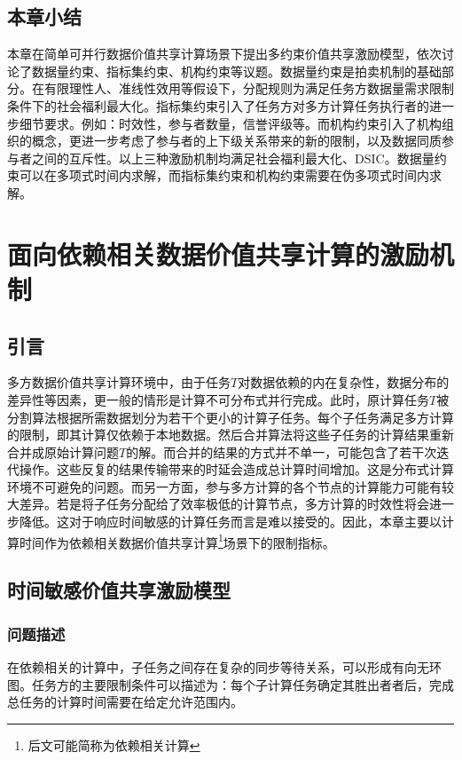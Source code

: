 \documentclass[promaster]{thesis-uestc}
\begin{document}
\FloatBarrier

\section{本章小结}
本章在简单可并行数据价值共享计算场景下提出多约束价值共享激励模型，依次讨论了数据量约束、指标集约束、机构约束等议题。数据量约束是拍卖机制的基础部分。在有限理性人、准线性效用等假设下，分配规则为满足任务方数据量需求限制条件下的社会福利最大化。指标集约束引入了任务方对多方计算任务执行者的进一步细节要求。例如：时效性，参与者数量，信誉评级等。而机构约束引入了机构组织的概念，更进一步考虑了参与者的上下级关系带来的新的限制，以及数据同质参与者之间的互斥性。以上三种激励机制均满足社会福利最大化、DSIC。数据量约束可以在多项式时间内求解，而指标集约束和机构约束需要在伪多项式时间内求解。

\chapter{面向依赖相关数据价值共享计算的激励机制}

\section{引言}
多方数据价值共享计算环境中，由于任务$T$对数据依赖的内在复杂性，数据分布的差异性等因素，更一般的情形是计算不可分布式并行完成。此时，原计算任务$T$被分割算法根据所需数据划分为若干个更小的计算子任务。每个子任务满足多方计算的限制，即其计算仅依赖于本地数据。然后合并算法将这些子任务的计算结果重新合并成原始计算问题$T$的解。而合并的结果的方式并不单一，可能包含了若干次迭代操作。这些反复的结果传输带来的时延会造成总计算时间增加。这是分布式计算环境不可避免的问题。而另一方面，参与多方计算的各个节点的计算能力可能有较大差异。若是将子任务分配给了效率极低的计算节点，多方计算的时效性将会进一步降低。这对于响应时间敏感的计算任务而言是难以接受的。因此，本章主要以计算时间作为依赖相关数据价值共享计算\footnote{后文可能简称为依赖相关计算}场景下的限制指标。

\section{时间敏感价值共享激励模型}

\subsection{问题描述}
在依赖相关的计算中，子任务之间存在复杂的同步等待关系，可以形成有向无环图。任务方的主要限制条件可以描述为：每个子计算任务确定其胜出者者后，完成总任务的计算时间需要在给定允许范围内。
\end{document}
